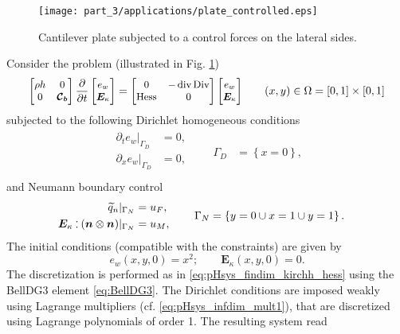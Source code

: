 \begin{figure}[t]
	\centering
	\texttt{[image: part\_3/applications/plate\_controlled.eps]}
	\caption{Cantilever plate subjected to a control forces on the lateral sides.}
	\label{fig:plate_controlled}
\end{figure}

Consider the problem (illustrated in Fig. \ref{fig:plate_controlled})
\begin{equation*}\small
\begin{bmatrix}
\rho h & 0 \\ 0 & \bm{\mathcal{C}_b} \\
\end{bmatrix}
\diffp{}{t}
\begin{bmatrix}
e_w \\ \bm{E}_\kappa \\
\end{bmatrix} = 
\begin{bmatrix}
0 & -\div\Div \\ \Hess & 0 \\
\end{bmatrix}
\begin{bmatrix}
e_w \\ \bm{E}_\kappa \\
\end{bmatrix} \qquad (x, y) \in \Omega = [0, 1]\times[0,1]
\end{equation*}
subjected to the following Dirichlet homogeneous conditions
\begin{align*}
\begin{aligned}
\partial_t e_w|_{\Gamma_D} &= 0, \\
\partial_x e_w|_{\Gamma_D} &= 0, \\
\end{aligned} \qquad {\Gamma_D} &= \left\{x = 0 \right\},
\end{align*}
and Neumann boundary control
\begin{align*}
\begin{aligned}
\widetilde{q}_n|_{\Gamma_N} &= u_F,\\
\bm{E}_\kappa \cddot (\bm{n}\otimes \bm{n})|_{\Gamma_N} &= u_M, \; \\
\end{aligned} \qquad {\Gamma_N} &= \left\{y = 0 \cup x=1 \cup y=1 \right\}.
\end{align*}
The initial conditions (compatible with the constraints) are given by
\[
e_w(x,y,0) = x^2; \qquad \bm{E}_\kappa(x,y,0) ={0}.
\]
The discretization is performed as in \eqref{eq:pHsys_findim_kirchh_hess} using the BellDG3 element \eqref{eq:BellDG3}. The Dirichlet conditions are imposed weakly using Lagrange multipliers (cf. \eqref{eq:pHsys_infdim_mult1}), that are discretized using Lagrange polynomials of order 1. The resulting system read

